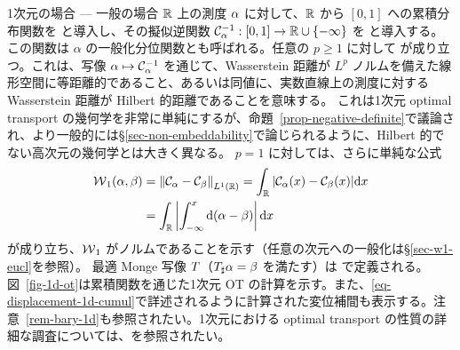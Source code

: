 \begin{rem2}{1次元の場合 --- 一般の場合}\label{rem-1d-ot-generic}
$\mathbb{R}$ 上の測度 $\alpha$ に対して、$\mathbb{R}$ から $[0,1]$ への累積分布関数を
と導入し、その擬似逆関数 $\mathcal{C}_{\alpha}^{-1} : [0,1] \rightarrow \mathbb{R} \cup \{-\infty\}$ を
と導入する。
%
この関数は $\alpha$ の一般化分位関数とも呼ばれる。任意の $p \geq 1$ に対して
が成り立つ。これは、写像 $\alpha \mapsto \mathcal{C}_{\alpha}^{-1}$ を通じて、Wasserstein 距離が $L^p$ ノルムを備えた線形空間に等距離的であること、あるいは同値に、実数直線上の測度に対する Wasserstein 距離が Hilbert 的距離であることを意味する。
これは1次元 optimal transport の幾何学を非常に単純にするが、命題~\ref{prop-negative-definite}で議論され、より一般的には\S\ref{sec-non-embeddability}で論じられるように、Hilbert 的でない高次元の幾何学とは大きく異なる。
%
$p=1$ に対しては、さらに単純な公式
\begin{align}\label{eq-w1-1d}
	\operatorname{\mathcal{W}}_1(\alpha,\beta) &= \left\|  \mathcal{C}_{\alpha} - \mathcal{C}_{\beta}  \right\|_{L^1(\mathbb{R})} =
	\int_{\mathbb{R}} | \mathcal{C}_{\alpha}(x) - \mathcal{C}_{\beta}(x) | \mathrm{d} x \\
	&= \int_{\mathbb{R}} \left\lvert \int_{-\infty}^x \mathrm{d}(\alpha-\beta) \right\rvert \mathrm{d} x
\end{align}
が成り立ち、$\operatorname{\mathcal{W}}_1$ がノルムであることを示す（任意の次元への一般化は\S\ref{sec-w1-eucl}を参照）。
%
最適 Monge 写像 $T$（$T_\sharp \alpha=\beta$ を満たす）は
で定義される。図~\ref{fig-1d-ot}は累積関数を通じた1次元 OT の計算を示す。また、\eqref{eq-displacement-1d-cumul}で詳述されるように計算された変位補間も表示する。注意~\ref{rem-bary-1d}も参照されたい。1次元における optimal transport の性質の詳細な調査については、\cite[Chapter 2]{SantambrogioBook}を参照されたい。
\end{rem2}


